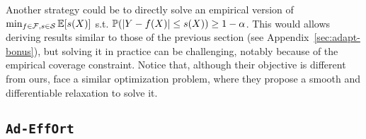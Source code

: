 \begin{remark}
    Another strategy could be to directly solve an empirical version of $\min_{f\in\mathcal{F},s\in{\cal S}}\mathbb{E}[s(X)]$ s.t.  ${\mathbb{P}}(|Y-f(X)|\leq s(X)) \geq 1-\alpha$. This would allows deriving results similar to those of the previous section (see Appendix~\ref{sec:adapt-bonus}), but solving it in practice can be challenging, notably because of the empirical coverage constraint.
    Notice that, although their objective is different from ours, \citet{baiefficient} face a similar optimization problem, where they propose a smooth and differentiable relaxation to solve it. %
\end{remark}



\subsection{\texttt{Ad-EffOrt}}

